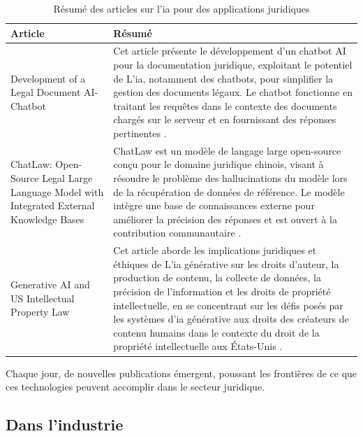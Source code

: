 \begin{table}[h]
\centering
\begin{tabular}{|m{}|m{}|}
\hline
\textbf{Article} & \textbf{Résumé} \\
\hline
Development of a Legal Document AI-Chatbot & Cet article présente le développement d'un chatbot AI pour la documentation juridique, exploitant le potentiel de L'\ac{ia}, notamment des chatbots, pour simplifier la gestion des documents légaux. Le chatbot fonctionne en traitant les requêtes dans le contexte des documents chargés sur le serveur et en fournissant des réponses pertinentes \cite{devaraj2023development}. \\
\hline
ChatLaw: Open-Source Legal Large Language Model with Integrated External Knowledge Bases & ChatLaw est un modèle de langage large open-source conçu pour le domaine juridique chinois, visant à résoudre le problème des hallucinations du modèle lors de la récupération de données de référence. Le modèle intègre une base de connaissances externe pour améliorer la précision des réponses et est ouvert à la contribution communautaire \cite{cui2023chatlaw}. \\
\hline
Generative AI and US Intellectual Property Law & Cet article aborde les implications juridiques et éthiques de L'\ac{ia} générative sur les droits d'auteur, la production de contenu, la collecte de données, la précision de l'information et les droits de propriété intellectuelle, en se concentrant sur les défis posés par les systèmes d'\ac{ia} générative aux droits des créateurs de contenu humains dans le contexte du droit de la propriété intellectuelle aux États-Unis \cite{poland2023generative}. \\
\hline
\end{tabular}
\caption{Résumé des articles sur l'\acf{ia} pour des applications juridiques}
\label{tab:law-article}
\end{table}

Chaque jour, de nouvelles publications émergent, poussant les frontières de ce que ces technologies peuvent accomplir dans le secteur juridique.

\newpage
\subsection{Dans l'industrie}

